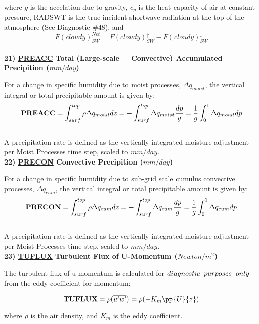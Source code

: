 \noindent
where $g$ is the accelation due to gravity,
$c_p$ is the heat capacity of air at constant pressure, RADSWT is the true incident
shortwave radiation at the top of the atmosphere (See Diagnostic \#48), and
\[
F(cloudy)_{SW}^{Net} = F(cloudy)_{SW}^\uparrow - F(cloudy)_{SW}^\downarrow
\]
\\

\noindent
{\bf 21)  \underline {PREACC} Total (Large-scale + Convective) Accumulated Precipition ($mm/day$) } 

\noindent
For a change in specific humidity due to moist processes, $\Delta q_{moist}$, 
the vertical integral or total precipitable amount is given by:   
\[
{\bf PREACC} = \int_{surf}^{top} \rho \Delta q_{moist} dz = - \int_{surf}^{top} \Delta  q_{moist}
{dp \over g} = {1 \over g} \int_0^1 \Delta q_{moist} dp
\]
\\

\noindent
A precipitation rate is defined as the vertically integrated moisture adjustment per Moist Processes
time step, scaled to $mm/day$.
\\

\noindent
{\bf 22)  \underline {PRECON} Convective Precipition ($mm/day$) } 

\noindent
For a change in specific humidity due to sub-grid scale cumulus convective processes, $\Delta q_{cum}$, 
the vertical integral or total precipitable amount is given by:   
\[
{\bf PRECON} = \int_{surf}^{top} \rho \Delta q_{cum} dz = - \int_{surf}^{top} \Delta  q_{cum}
{dp \over g} = {1 \over g} \int_0^1 \Delta q_{cum} dp
\]
\\

\noindent
A precipitation rate is defined as the vertically integrated moisture adjustment per Moist Processes
time step, scaled to $mm/day$.
\\

\noindent
{\bf 23)  \underline {TUFLUX}  Turbulent Flux of U-Momentum ($Newton/m^2$) }

\noindent
The turbulent flux of u-momentum is calculated for $diagnostic \hspace{.2cm} purposes
 \hspace{.2cm} only$ from the eddy coefficient for momentum:

\[
{\bf TUFLUX} =  {\rho } {(\overline{u^{\prime}w^{\prime}})} =  
{\rho } {(- K_m \pp{U}{z})}
\]
 
\noindent
where $\rho$ is the air density, and $K_m$ is the eddy coefficient.
\\

